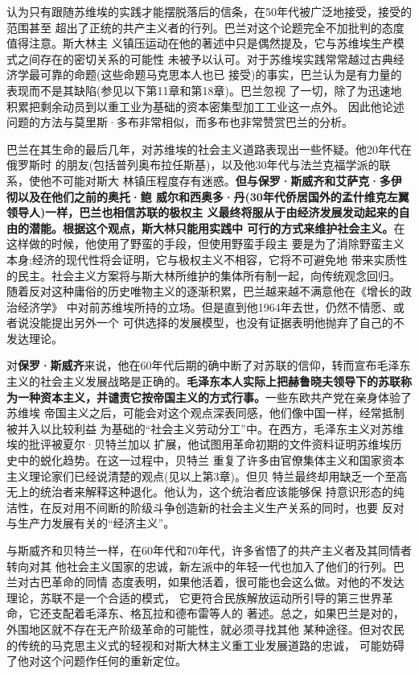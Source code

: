 认为只有跟随苏维埃的实践才能摆脱落后的信条，在50年代被广泛地接受，接受的范围甚至
超出了正统的共产主义者的行列。巴兰对这个论题完全不加批判的态度值得注意。斯大林主
义镇压运动在他的著述中只是偶然提及，它与苏维埃生产模式之间存在的密切关系的可能性
未被予以认可。对于苏维埃实践常常越过古典经济学最可靠的命题(这些命题马克思本人也已
接受)的事实，巴兰认为是有力量的表现而不是其缺陷(参见以下第11章和第18章)。巴兰忽视
了一切，除了为迅速地积累把剩余动员到以重工业为基础的资本密集型加工工业这一点外。
因此他论述问题的方法与莫里斯·多布非常相似，而多布也非常赞赏巴兰的分析。

巴兰在其生命的最后几年，对苏维埃的社会主义道路表现出一些怀疑。他20年代在俄罗斯时
的朋友(包括普列奥布拉任斯基)，以及他30年代与法兰克福学派的联系，使他不可能对斯大
林镇压程度存有迷惑。\textbf{但与保罗·斯威齐和艾萨克·多伊彻以及在他们之前的奥托·鲍
  威尔和西奥多·丹(30年代侨居国外的孟什维克左翼领导人)一样，巴兰也相信苏联的极权主
  义最终将服从于由经济发展发动起来的自由的潜能。根据这个观点，斯大林只能用实践中
  可行的方式来维护社会主义。}在这样做的时候，他使用了野蛮的手段，但使用野蛮手段主
要是为了消除野蛮主义本身;经济的现代性将会证明，它与极权主义不相容，它将不可避免地
带来实质性的民主。社会主义方案将与斯大林所维护的集体所有制一起，向传统观念回归。
随着反对这种庸俗的历史唯物主义的逐渐积累，巴兰越来越不满意他在《增长的政治经济学》
中对前苏维埃所持的立场。但是直到他1964年去世，仍然不情愿、或者说没能提出另外一个
可供选择的发展模型，也没有证据表明他抛弃了自己的不发达理论。

对\textbf{保罗·斯威齐}来说，他在60年代后期的确中断了对苏联的信仰，转而宣布毛泽东
主义的社会主义发展战略是正确的。\textbf{毛泽东本人实际上把赫鲁晓夫领导下的苏联称
  为一种资本主义，并谴责它按帝国主义的方式行事。}一些东欧共产党在亲身体验了苏维埃
帝国主义之后，可能会对这个观点深表同感，他们像中国一样，经常抵制被并入以比较利益
为基础的“社会主义劳动分工”中。在西方，毛泽东主义对苏维埃的批评被夏尔·贝特兰加以
扩展，他试图用革命初期的文件资料证明苏维埃历史中的蜕化趋势。在这一过程中，贝特兰
重复了许多由官僚集体主义和国家资本主义理论家们已经说清楚的观点(见以上第3章)。但贝
特兰最终却用缺乏一个至高无上的统治者来解释这种退化。他认为，这个统治者应该能够保
持意识形态的纯洁性，在反对用不间断的阶级斗争创造新的社会主义生产关系的同时，也要
反对与生产力发展有关的“经济主义”。

与斯威齐和贝特兰一样，在60年代和70年代，许多省悟了的共产主义者及其同情者转向对其
他社会主义国家的忠诚，新左派中的年轻一代也加入了他们的行列。巴兰对古巴革命的同情
态度表明，如果他活着，很可能也会这么做。对他的不发达理论，苏联不是一个合适的模式，
它更符合民族解放运动所引导的第三世界革命，它还支配着毛泽东、格瓦拉和德布雷等人的
著述。总之，如果巴兰是对的，外围地区就不存在无产阶级革命的可能性，就必须寻找其他
某种途径。但对农民的传统的马克思主义式的轻视和对斯大林主义重工业发展道路的忠诚，
可能妨碍了他对这个问题作任何的重新定位。

